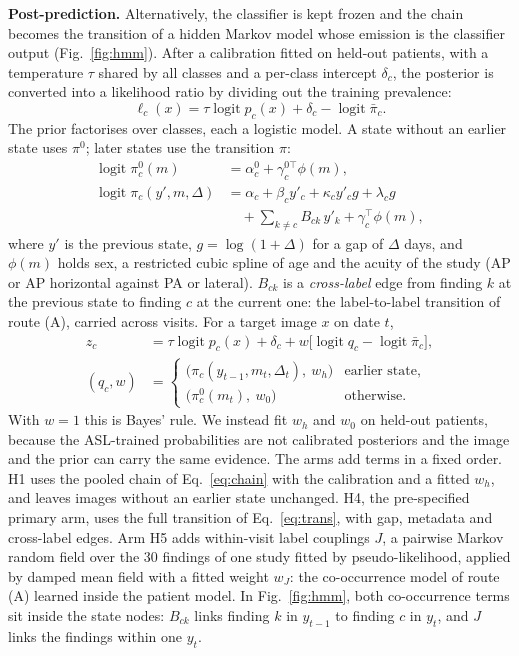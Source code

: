 \documentclass[conference]{IEEEtran}
\begin{document}
\textbf{Post-prediction.} Alternatively, the classifier is kept frozen and the chain becomes the transition of a hidden Markov model whose emission is the classifier output (Fig.~\ref{fig:hmm}). After a calibration fitted on held-out patients, with a temperature $\tau$ shared by all classes and a per-class intercept $\delta_c$, the posterior is converted into a likelihood ratio by dividing out the training prevalence:
\begin{equation}
\ell_c(x) = \tau \operatorname{logit} p_c(x) + \delta_c - \operatorname{logit} \bar\pi_c .
\label{eq:emission}
\end{equation}
The prior factorises over classes, each a logistic model. A state without an earlier state uses $\pi^{0}$; later states use the transition $\pi$:
\begin{align}
\operatorname{logit} \pi^{0}_c(m) &= \alpha^{0}_c + \gamma^{0\top}_c \phi(m), \label{eq:init}\\
\operatorname{logit} \pi_c(y', m, \Delta) &= \alpha_c + \beta_c y'_c + \kappa_c y'_c g + \lambda_c g \nonumber\\
&\quad + \textstyle\sum_{k \neq c} B_{ck}\, y'_k + \gamma_c^{\top} \phi(m), \label{eq:trans}
\end{align}
where $y'$ is the previous state, $g = \log(1 + \Delta)$ for a gap of $\Delta$ days, and $\phi(m)$ holds sex, a restricted cubic spline of age and the acuity of the study (AP or AP horizontal against PA or lateral). $B_{ck}$ is a \emph{cross-label} edge from finding $k$ at the previous state to finding $c$ at the current one: the label-to-label transition of route (A), carried across visits. For a target image $x$ on date $t$,
\begin{align}
z_c &= \tau \operatorname{logit} p_c(x) + \delta_c + w \bigl[\operatorname{logit} q_c - \operatorname{logit} \bar\pi_c\bigr], \label{eq:fuse}\\
(q_c, w) &= \begin{cases}
\bigl(\pi_c(y_{t-1}, m_t, \Delta_t),\ w_h\bigr) & \text{earlier state},\\
\bigl(\pi^{0}_c(m_t),\ w_0\bigr) & \text{otherwise}.
\end{cases} \label{eq:qw}
\end{align}
With $w = 1$ this is Bayes' rule. We instead fit $w_h$ and $w_0$ on held-out patients, because the ASL-trained probabilities are not calibrated posteriors and the image and the prior can carry the same evidence. The arms add terms in a fixed order. H1 uses the pooled chain of Eq.~\eqref{eq:chain} with the calibration and a fitted $w_h$, and leaves images without an earlier state unchanged. H4, the pre-specified primary arm, uses the full transition of Eq.~\eqref{eq:trans}, with gap, metadata and cross-label edges. Arm H5 adds within-visit label couplings $J$, a pairwise Markov random field over the 30 findings of one study fitted by pseudo-likelihood, applied by damped mean field with a fitted weight $w_J$: the co-occurrence model of route (A) learned inside the patient model. In Fig.~\ref{fig:hmm}, both co-occurrence terms sit inside the state nodes: $B_{ck}$ links finding $k$ in $y_{t-1}$ to finding $c$ in $y_t$, and $J$ links the findings within one $y_t$.
\end{document}
